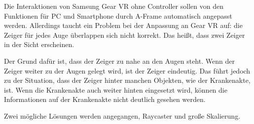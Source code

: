   \noindent
  Die Interaktionen von Samsung Gear VR ohne Controller sollen von den Funktionen für PC und Smartphone durch A-Frame automatisch angepasst werden. Allerdings taucht ein Problem bei der Anpassung an Gear VR auf: die Zeiger für jedes Auge überlappen sich nicht korrekt. Das heißt, dass zwei Zeiger in der Sicht erscheinen.
  
  Der Grund dafür ist, dass der Zeiger zu nahe an den Augen steht. Wenn der Zeiger weiter zu der Augen gelegt wird, ist der Zeiger eindeutig. Das führt jedoch zu der Situation, dass der Zeiger hinter manchen Objekten, wie der Krankenakte, ist. Wenn die Krankenakte auch weiter hinten eingesetzt wird, können die Informationen auf der Krankenakte nicht deutlich gesehen werden.
  
  Zwei mögliche Lösungen werden angegangen, Raycaster und große Skalierung.
